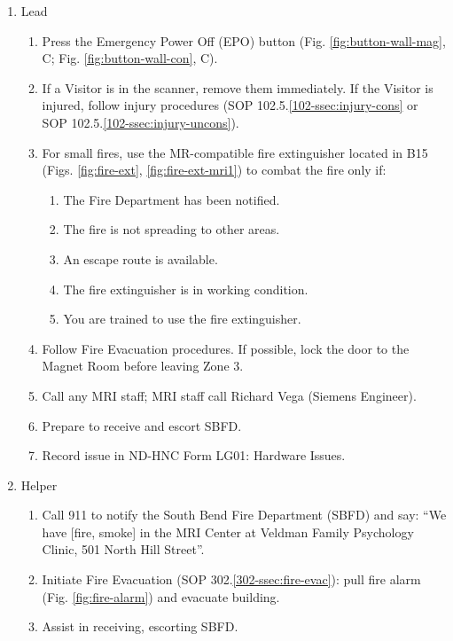 \documentclass[11pt]{article}
\begin{document}
\begin{enumerate}
	\item Lead
	\begin{enumerate}
		\item Press the Emergency Power Off (EPO) button (Fig. \ref{fig:button-wall-mag}, C; Fig. \ref{fig:button-wall-con}, C).
		\item If a Visitor is in the scanner, remove them immediately. If the Visitor is injured, follow injury procedures (SOP 102.5.\ref{102-ssec:injury-cons} or SOP 102.5.\ref{102-ssec:injury-uncons}).
		\item For small fires, use the MR-compatible fire extinguisher located in B15 (Figs. \ref{fig:fire-ext}, \ref{fig:fire-ext-mri1}) to combat the fire only if:
		\begin{enumerate}
			\item The Fire Department has been notified.
			\item The fire is not spreading to other areas.
			\item An escape route is available.
			\item The fire extinguisher is in working condition.
			\item You are trained to use the fire extinguisher.
		\end{enumerate}
		\item Follow Fire Evacuation procedures. If possible, lock the door to the Magnet Room before leaving Zone 3.
		\item Call any MRI staff; MRI staff call Richard Vega (Siemens Engineer).
		\item Prepare to receive and escort SBFD.
		\item Record issue in ND-HNC Form LG01: Hardware Issues.
	\end{enumerate}

	\item Helper
	\begin{enumerate}
		\item Call 911 to notify the South Bend Fire Department (SBFD) and say: ``We have [fire, smoke] in the MRI Center at Veldman Family Psychology Clinic, 501 North Hill Street''.
		\item Initiate Fire Evacuation (SOP 302.\ref{302-ssec:fire-evac}): pull fire alarm (Fig. \ref{fig:fire-alarm}) and evacuate building.
		\item Assist in receiving, escorting SBFD.
	\end{enumerate}
\end{enumerate}
\end{document}
